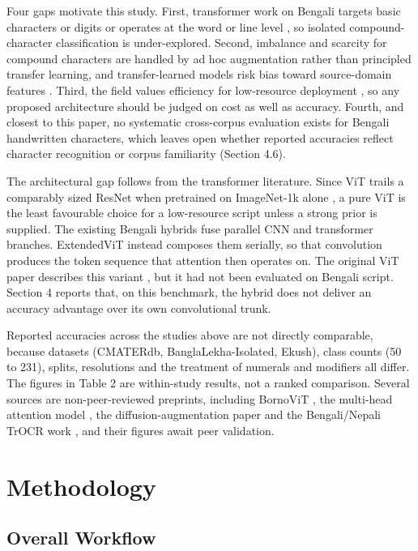 Four gaps motivate this study. First, transformer work on Bengali targets basic characters or digits \citep{ref17,ref18,ref19,ref38} or operates at the word or line level \citep{ref20,ref39,ref21}, so isolated compound-character classification is under-explored. Second, imbalance and scarcity for compound characters are handled by ad hoc augmentation \citep{ref37,ref24} rather than principled transfer learning, and transfer-learned models risk bias toward source-domain features \citep{ref17}. Third, the field values efficiency for low-resource deployment \citep{ref18,ref20}, so any proposed architecture should be judged on cost as well as accuracy. Fourth, and closest to this paper, no systematic cross-corpus evaluation exists for Bengali handwritten characters, which leaves open whether reported accuracies reflect character recognition or corpus familiarity (Section 4.6).

The architectural gap follows from the transformer literature. Since ViT trails a comparably sized ResNet when pretrained on ImageNet-1k alone \citep{ref22}, a pure ViT is the least favourable choice for a low-resource script unless a strong prior is supplied. The existing Bengali hybrids \citep{ref19,ref25} fuse parallel CNN and transformer branches. ExtendedViT instead composes them serially, so that convolution produces the token sequence that attention then operates on. The original ViT paper describes this variant \citep{ref22}, but it had not been evaluated on Bengali script. Section 4 reports that, on this benchmark, the hybrid does not deliver an accuracy advantage over its own convolutional trunk.

Reported accuracies across the studies above are not directly comparable, because datasets (CMATERdb, BanglaLekha-Isolated, Ekush), class counts (50 to 231), splits, resolutions and the treatment of numerals and modifiers all differ. The figures in Table 2 are within-study results, not a ranked comparison. Several sources are non-peer-reviewed preprints, including BornoViT \citep{ref18}, the multi-head attention model \citep{ref25}, the diffusion-augmentation paper \citep{ref24} and the Bengali/Nepali TrOCR work \citep{ref21}, and their figures await peer validation.


\hypertarget{methodology}{%
\section{Methodology}\label{methodology}}

\hypertarget{overall-workflow}{%
\subsection{Overall Workflow}\label{overall-workflow}}

